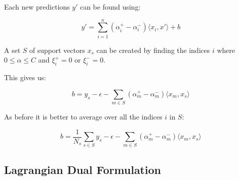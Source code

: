 Each new predictions $y'$ can be found using:

\begin{equation}
    y'=\displaystyle \sum_{i=1}^{n}(\alpha_i^+ - \alpha_i^-)\langle x_i, x' \rangle+b \tag{2.16}
\end{equation}

A set $S$ of support vectors $x_s$ can be created by finding the indices $i$ where $0\leq\alpha\leq C$ and $\xi_i^+=0$ or $\xi_i^-=0$.

This gives us:

\begin{equation}
    b=y_s-\displaystyle \epsilon-\sum_{m\in S}(\alpha_m^+ -\alpha_m^-) \langle x_m, x_s \rangle \tag{2.17}
\end{equation}

As before it is better to average over all the indices $i$ in $S$:

\begin{equation}
    b=\displaystyle \frac{1}{N_s}\sum_{s\in S}y_s-\epsilon-\sum_{m \in S}(\alpha_m^+ - \alpha_m^-)\langle x_m, x_s \rangle \tag{2.18}
\end{equation}

\subsection{Lagrangian Dual Formulation}
